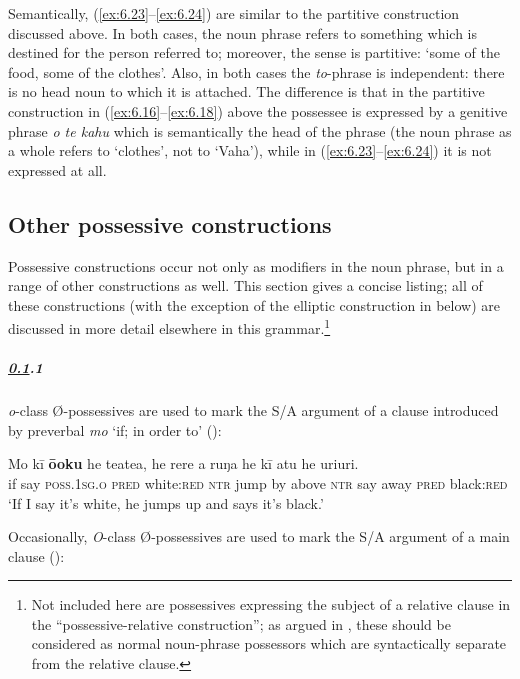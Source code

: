 Semantically, (\ref{ex:6.23}–\ref{ex:6.24}) are similar to the partitive construction discussed above. In both cases, the noun phrase refers to something which is destined for the person referred to; moreover, the sense is partitive: ‘some of the food, some of the clothes’. Also, in both cases the \textit{to}{}-phrase is independent: there is no head noun to which it is attached. The difference is that in the partitive construction in (\ref{ex:6.16}–\ref{ex:6.18}) above the possessee is expressed by a genitive phrase \textit{o te kahu} which is semantically the head of the phrase (the noun phrase as a whole refers to ‘clothes’, not to ‘Vaha’), while in (\ref{ex:6.23}–\ref{ex:6.24}) it is not expressed at all.
\subsection{Other possessive constructions}\label{sec:6.2.3}

Possessive constructions occur not only as modifiers in the noun phrase, but in a range of other constructions as well. This section gives a concise listing; all of these constructions (with the exception of the elliptic construction in  below) are discussed in more detail elsewhere in this grammar.\footnote{\label{fn:287}Not included here are possessives expressing the subject of a relative clause in the “possessive-relative construction”; as argued in , these should be considered as normal noun-phrase possessors which are syntactically separate from the relative clause.}
\subparagraph{\ref{sec:6.2.3}.1} \textit{o}{}-class Ø-possessives are used to mark the S/A argument of a clause introduced by preverbal \textit{mo} ‘if; in order to’ ():

\ea\label{ex:6.26}
\gll Mo kī \textbf{ō{\ꞌ}oku} he teatea, he rere a ruŋa he kī atu he {\ꞌ}uri{\ꞌ}uri. \\
if say \textsc{poss.1sg.o} \textsc{pred} white:\textsc{red} \textsc{ntr} jump by above \textsc{ntr} say away \textsc{pred} black:\textsc{red} \\

\glt
‘If I say it’s white, he jumps up and says it’s black.’ \textstyleExampleref{[R480.003]} 
\z

Occasionally, \textit{O}-class Ø-possessives are used to mark the S/A argument of a main clause ():

